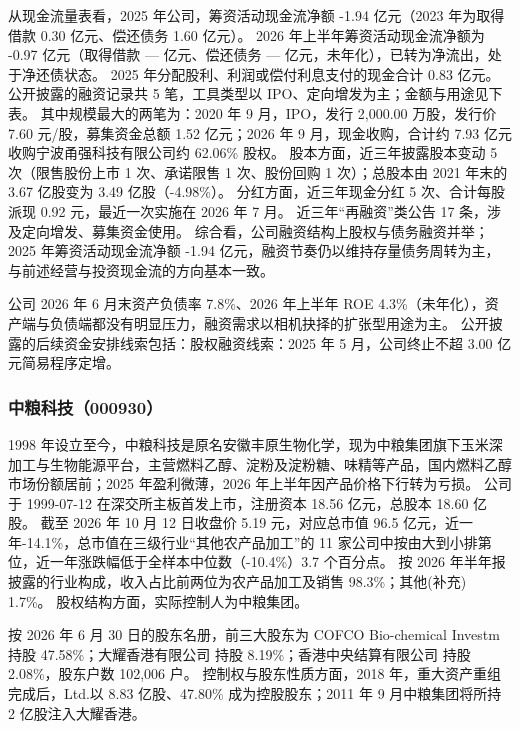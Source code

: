  从现金流量表看，2025 年公司，筹资活动现金流净额 -1.94 亿元（2023 年为取得借款 0.30 亿元、偿还债务 1.60 亿元）。 2026 年上半年筹资活动现金流净额为 -0.97 亿元（取得借款 — 亿元、偿还债务 — 亿元，未年化），已转为净流出，处于净还债状态。 2025 年分配股利、利润或偿付利息支付的现金合计 0.83 亿元。 公开披露的融资记录共 5 笔，工具类型以 IPO、定向增发为主；金额与用途见下表。 其中规模最大的两笔为：2020 年 9 月，IPO，发行 2,000.00 万股，发行价 7.60 元/股，募集资金总额 1.52 亿元；2026 年 9 月，现金收购，合计约 7.93 亿元收购宁波甬强科技有限公司约 62.06\% 股权。 股本方面，近三年披露股本变动 5 次（限售股份上市 1 次、承诺限售 1 次、股份回购 1 次）；总股本由 2021 年末的 3.67 亿股变为 3.49 亿股（-4.98\%）。 分红方面，近三年现金分红 5 次、合计每股派现 0.92 元，最近一次实施在 2026 年 7 月。 近三年“再融资”类公告 17 条，涉及定向增发、募集资金使用。 综合看，公司融资结构上股权与债务融资并举；2025 年筹资活动现金流净额 -1.94 亿元，融资节奏仍以维持存量债务周转为主，与前述经营与投资现金流的方向基本一致。

 公司 2026 年 6 月末资产负债率 7.8\%、2026 年上半年 ROE 4.3\%（未年化），资产端与负债端都没有明显压力，融资需求以相机抉择的扩张型用途为主。 公开披露的后续资金安排线索包括：股权融资线索：2025 年 5 月，公司终止不超 3.00 亿元简易程序定增。




\subsubsection{中粮科技（000930）}
\label{co:000930}

 1998 年设立至今，中粮科技是原名安徽丰原生物化学，现为中粮集团旗下玉米深加工与生物能源平台，主营燃料乙醇、淀粉及淀粉糖、味精等产品，国内燃料乙醇市场份额居前；2025 年盈利微薄，2026 年上半年因产品价格下行转为亏损。 公司于 1999-07-12 在深交所主板首发上市，注册资本 18.56 亿元，总股本 18.60 亿股。 截至 2026 年 10 月 12 日收盘价 5.19 元，对应总市值 96.5 亿元，近一年-14.1\%，总市值在三级行业“其他农产品加工”的 11 家公司中按由大到小排第位，近一年涨跌幅低于全样本中位数（-10.4\%）3.7 个百分点。 按 2026 年半年报披露的行业构成，收入占比前两位为农产品加工及销售 98.3\%；其他(补充) 1.7\%。 股权结构方面，实际控制人为中粮集团。

 按 2026 年 6 月 30 日的股东名册，前三大股东为 COFCO Bio-chemical Investm 持股 47.58\%；大耀香港有限公司 持股 8.19\%；香港中央结算有限公司 持股 2.08\%，股东户数 102,006 户。 控制权与股东性质方面，2018 年，重大资产重组完成后，Ltd.以 8.83 亿股、47.80\% 成为控股股东；2011 年 9 月中粮集团将所持 2 亿股注入大耀香港。

